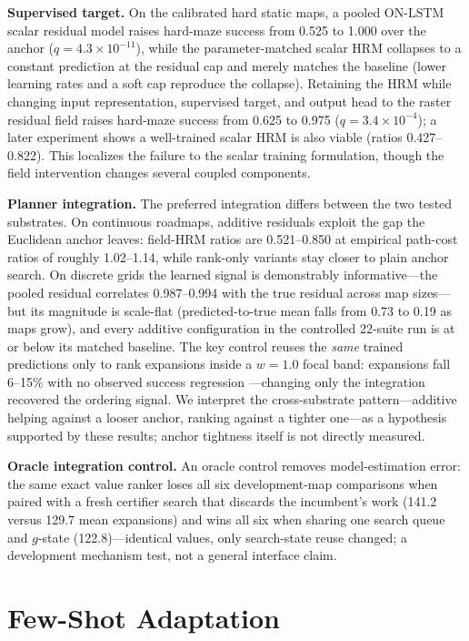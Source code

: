 \documentclass[letterpaper]{article} %
\begin{document}
\textbf{Supervised target.} On the calibrated hard static maps, a pooled ON-LSTM scalar residual model raises hard-maze success from 0.525 to 1.000 over the anchor ($q=4.3\times10^{-11}$), while the parameter-matched scalar HRM collapses to a constant prediction at the residual cap and merely matches the baseline (lower learning rates and a soft cap reproduce the collapse). Retaining the HRM while changing input representation, supervised target, and output head to the raster residual field raises hard-maze success from 0.625 to 0.975 ($q=3.4\times10^{-4}$); a later experiment shows a well-trained scalar HRM is also viable (ratios 0.427--0.822). This localizes the failure to the scalar training formulation, though the field intervention changes several coupled components.

\textbf{Planner integration.} The preferred integration differs between the two tested substrates. On continuous roadmaps, additive residuals exploit the gap the Euclidean anchor leaves: field-HRM ratios are 0.521--0.850 at empirical path-cost ratios of roughly 1.02--1.14, while rank-only variants stay closer to plain anchor search. On discrete grids the learned signal is demonstrably informative---the pooled residual correlates 0.987--0.994 with the true residual across map sizes---but its magnitude is scale-flat (predicted-to-true mean falls from 0.73 to 0.19 as maps grow), and every additive configuration in the controlled 22-suite run is at or below its matched baseline. The key control reuses the \emph{same} trained predictions only to rank expansions inside a $w{=}1.0$ focal band: expansions fall 6--15\% with no observed success regression \citep{chrestien2023rank}---changing only the integration recovered the ordering signal. We interpret the cross-substrate pattern---additive helping against a looser anchor, ranking against a tighter one---as a hypothesis supported by these results; anchor tightness itself is not directly measured.

\textbf{Oracle integration control.} An oracle control removes model-estimation error: the same exact value ranker loses all six development-map comparisons when paired with a fresh certifier search that discards the incumbent's work (141.2 versus 129.7 mean expansions) and wins all six when sharing one search queue and $g$-state (122.8)---identical values, only search-state reuse changed; a development mechanism test, not a general interface claim.

\section{Few-Shot Adaptation}
\end{document}
